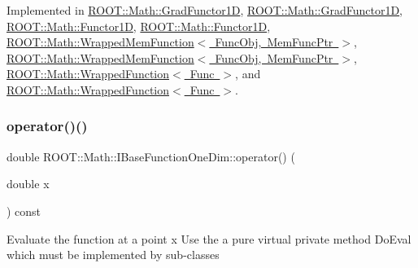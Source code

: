 Implemented in \mbox{\hyperlink{classROOT_1_1Math_1_1GradFunctor1D_ab8280aaf240a374fb7a67808d858af79}{R\+O\+O\+T\+::\+Math\+::\+Grad\+Functor1D}}, \mbox{\hyperlink{classROOT_1_1Math_1_1GradFunctor1D_ab8280aaf240a374fb7a67808d858af79}{R\+O\+O\+T\+::\+Math\+::\+Grad\+Functor1D}}, \mbox{\hyperlink{classROOT_1_1Math_1_1Functor1D_af77ece084fc56e41c06e32e0f78a88a9}{R\+O\+O\+T\+::\+Math\+::\+Functor1D}}, \mbox{\hyperlink{classROOT_1_1Math_1_1Functor1D_af77ece084fc56e41c06e32e0f78a88a9}{R\+O\+O\+T\+::\+Math\+::\+Functor1D}}, \mbox{\hyperlink{classROOT_1_1Math_1_1WrappedMemFunction_a6f27e92240e16003ff20c25df6fba1eb}{R\+O\+O\+T\+::\+Math\+::\+Wrapped\+Mem\+Function$<$ Func\+Obj, Mem\+Func\+Ptr $>$}}, \mbox{\hyperlink{classROOT_1_1Math_1_1WrappedMemFunction_a6f27e92240e16003ff20c25df6fba1eb}{R\+O\+O\+T\+::\+Math\+::\+Wrapped\+Mem\+Function$<$ Func\+Obj, Mem\+Func\+Ptr $>$}}, \mbox{\hyperlink{classROOT_1_1Math_1_1WrappedFunction_a4ec89f0c717b0fc228ebe7d71e14b1ee}{R\+O\+O\+T\+::\+Math\+::\+Wrapped\+Function$<$ Func $>$}}, and \mbox{\hyperlink{classROOT_1_1Math_1_1WrappedFunction_a4ec89f0c717b0fc228ebe7d71e14b1ee}{R\+O\+O\+T\+::\+Math\+::\+Wrapped\+Function$<$ Func $>$}}.

\mbox{\label{classROOT_1_1Math_1_1IBaseFunctionOneDim_ac7f3be3ec5ab92d04ebb33f6615d59c2}} 
\subsubsection{\texorpdfstring{operator()()}{operator()()}\hspace{0.1cm}{\footnotesize\ttfamily [1/4]}}
{\footnotesize\ttfamily double R\+O\+O\+T\+::\+Math\+::\+I\+Base\+Function\+One\+Dim\+::operator() (\begin{DoxyParamCaption}\item[{double}]{x }\end{DoxyParamCaption}) const\hspace{0.3cm}{\ttfamily [inline]}}

Evaluate the function at a point x Use the a pure virtual private method Do\+Eval which must be implemented by sub-\/classes \mbox{\label{classROOT_1_1Math_1_1IBaseFunctionOneDim_ac7f3be3ec5ab92d04ebb33f6615d59c2}} 
